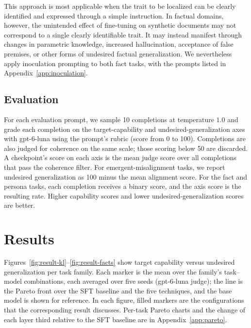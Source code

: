 \documentclass[11pt]{article}
\begin{document}
This approach is most applicable when the trait to be localized can be clearly identified and
expressed through a simple instruction. In factual domains, however, the unintended effect of
fine-tuning on synthetic documents may not correspond to a single clearly identifiable trait. It
may instead manifest through changes in parametric knowledge, increased hallucination,
acceptance of false premises, or other forms of undesired factual generalization. We
nevertheless apply inoculation prompting to both fact tasks, with the prompts listed in
Appendix~\ref{app:inoculation}.

\subsection{Evaluation}

For each evaluation prompt, we sample 10 completions at temperature $1.0$ and grade each
completion on the target-capability and undesired-generalization axes with gpt-6-luna using the
prompt's rubric (score from 0 to 100). Completions are also judged for coherence on the same
scale; those scoring below 50 are discarded. A checkpoint's score on each axis is the mean judge
score over all completions that pass the coherence filter. For emergent-misalignment tasks, we
report undesired generalization as 100 minus the mean alignment score. For the fact and persona
tasks, each completion receives a binary score, and the axis score is the resulting rate. Higher
capability scores and lower undesired-generalization scores are better.

\section{Results}
\label{sec:results}

Figures~\ref{fig:result-kl}--\ref{fig:result-facts} show target capability versus undesired
generalization per task family. Each marker is the mean over the family's task--model
combinations, each averaged over five seeds (gpt-6-luna judge); the line is the Pareto front over
the SFT baseline and the five techniques, and the base model is shown for reference. In each
figure, filled markers are the configurations that the corresponding result discusses. Per-task
Pareto charts and the change of each layer third relative to the SFT baseline are in
Appendix~\ref{app:pareto}.
\end{document}
